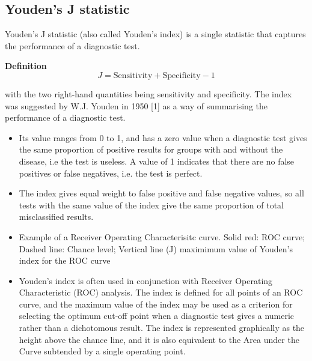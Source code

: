 \subsection{Youden's J statistic}

Youden's J statistic (also called Youden's index) is a single statistic that captures the performance of a diagnostic test.

\textbf{Definition}
\[ J = \mbox{Sensitivity} + \mbox{Specificity} − 1 \]

with the two right-hand quantities being sensitivity and specificity.
The index was suggested by W.J. Youden in 1950 [1] as a way of summarising the performance of a diagnostic test. 

\begin{itemize}
\item Its value ranges from 0 to 1, and has a zero value when a diagnostic test gives the same proportion of positive results for groups with and without the disease, i.e the test is useless. A value of 1 indicates that there are no false positives or false negatives, i.e. the test is perfect. 
\item 
The index gives equal weight to false positive and false negative values, so all tests with the same value of the index give the same proportion of total misclassified results.
\item 
Example of a Receiver Operating Characterisitc curve. Solid red: ROC curve; Dashed line: Chance level; Vertical line (J) maximimum value of Youden's index for the ROC curve
\item 
Youden's index is often used in conjunction with Receiver Operating Characteristic (ROC) analysis. The index is defined for all points of an ROC curve, and the maximum value of the index may be used as a criterion for selecting the optimum cut-off point when a diagnostic test gives a numeric rather than a dichotomous result. The index is represented graphically as the height above the chance line, and it is also equivalent to the Area under the Curve subtended by a single operating point.
\end{itemize}
